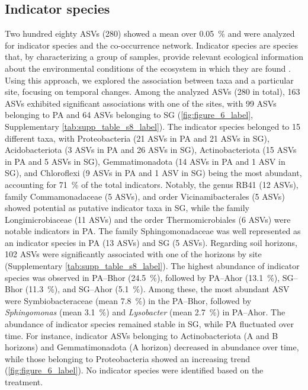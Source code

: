 \subsection{Indicator species}

Two hundred eighty ASVs (\num{280}) showed a mean over \SI{0.05}{\percent} and were analyzed for indicator species and the co-occurrence network. Indicator species are species that, by characterizing a group of samples, provide relevant ecological information about the environmental conditions of the ecosystem in which they are found \citep{Dufrene1997}. Using this approach, we explored the association between taxa and a particular site, focusing on temporal changes. Among the analyzed ASVs (\num{280} in total), 163 ASVs exhibited significant associations with one of the sites, with 99 ASVs belonging to PA and 64 ASVs belonging to SG (\cref{fig:figure_6_label}, Supplementary \cref{tab:supp_table_s8_label}). The indicator species belonged to 15 different taxa, with Proteobacteria (21 ASVs in PA and 21 ASVs in SG), Acidobacteriota (3 ASVs in PA and 26 ASVs in SG), Actinobacteriota (15 ASVs in PA and 5 ASVs in SG), Gemmatimonadota (14 ASVs in PA and 1 ASV in SG), and Chloroflexi (9 ASVs in PA and 1 ASV in SG) being the most abundant, accounting for \SI{71}{\percent} of the total indicators. Notably, the genus RB41 (12 ASVs), family Commamonadaceae (5 ASVs), and order Vicinamibacterales (5 ASVs) showed potential as putative indicator taxa in SG, while the family Longimicrobiaceae (11 ASVs) and the order Thermomicrobiales (6 ASVs) were notable indicators in PA. The family Sphingomonadaceae was well represented as an indicator species in PA (13 ASVs) and SG (5 ASVs). Regarding soil horizons, 102 ASVs were significantly associated with one of the horizons by site (Supplementary \cref{tab:supp_table_s8_label}). The highest abundance of indicator species was observed in PA--Bhor (\SI{24.5}{\percent}), followed by PA--Ahor (\SI{13.1}{\percent}), SG--Bhor (\SI{11.3}{\percent}), and SG--Ahor (\SI{5.1}{\percent}). Among these, the most abundant ASV were Symbiobacteraceae (mean \SI{7.8}{\percent}) in the PA--Bhor, followed by \textit{Sphingomonas} (mean \SI{3.1}{\percent}) and \textit{Lysobacter} (mean \SI{2.7}{\percent}) in PA--Ahor. The abundance of indicator species remained stable in SG, while PA fluctuated over time. For instance, indicator ASVs belonging to Actinobacteriota (A and B horizons) and Gemmatimonadota (A horizon) decreased in abundance over time, while those belonging to Proteobacteria showed an increasing trend (\cref{fig:figure_6_label}). No indicator species were identified based on the treatment.

